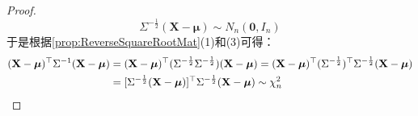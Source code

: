 \begin{proof}
	\begin{equation*}
		\Sigma^{-\frac{1}{2}}(\mathbf{X}-\boldsymbol{\mu})\sim N_n(\mathbf{0},I_n)
	\end{equation*}
	于是根据\cref{prop:ReverseSquareRootMat}(1)和(3)可得：
	\begin{align*}
		(\mathbf{X}-\boldsymbol{\mu})^{\top}\Sigma^{-1}(\mathbf{X}-\boldsymbol{\mu})&=(\mathbf{X}-\boldsymbol{\mu})^{\top}(\Sigma^{-\frac{1}{2}}\Sigma^{-\frac{1}{2}})(\mathbf{X}-\boldsymbol{\mu}) =(\mathbf{X}-\boldsymbol{\mu})^{\top}(\Sigma^{-\frac{1}{2}})^{\top}\Sigma^{-\frac{1}{2}}(\mathbf{X}-\boldsymbol{\mu}) \\
		&=[\Sigma^{-\frac{1}{2}}(\mathbf{X}-\boldsymbol{\mu})]^{\top}\Sigma^{-\frac{1}{2}}(\mathbf{X}-\boldsymbol{\mu})\sim\chi_n^2\qedhere
	\end{align*}
\end{proof}
